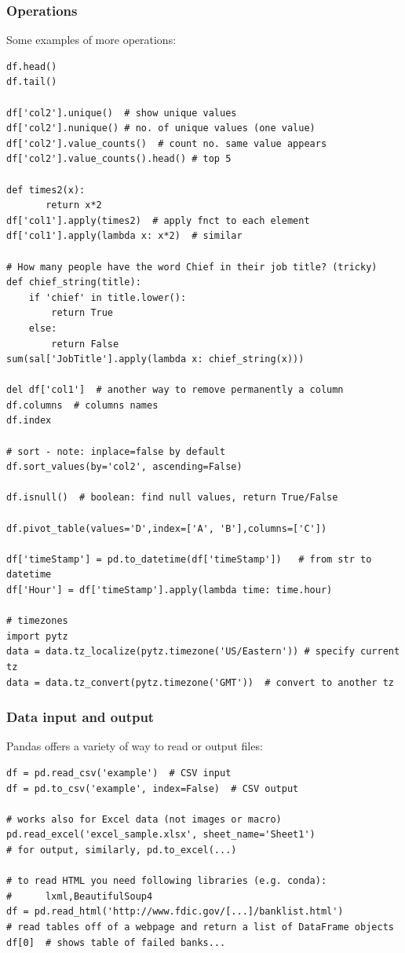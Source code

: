 \documentclass[11pt]{article}
\begin{document}
\subsubsection{Operations}
Some examples of more operations:
\begin{lstlisting}
df.head()
df.tail()

df['col2'].unique()  # show unique values
df['col2'].nunique() # no. of unique values (one value)
df['col2'].value_counts()  # count no. same value appears
df['col2'].value_counts().head() # top 5

def times2(x): 
       return x*2
df['col1'].apply(times2)  # apply fnct to each element
df['col1'].apply(lambda x: x*2)  # similar

# How many people have the word Chief in their job title? (tricky)
def chief_string(title):
	if 'chief' in title.lower():
		return True
	else:
		return False
sum(sal['JobTitle'].apply(lambda x: chief_string(x)))

del df['col1']  # another way to remove permanently a column
df.columns  # columns names
df.index 

# sort - note: inplace=false by default
df.sort_values(by='col2', ascending=False)  

df.isnull()  # boolean: find null values, return True/False

df.pivot_table(values='D',index=['A', 'B'],columns=['C'])

df['timeStamp'] = pd.to_datetime(df['timeStamp'])   # from str to datetime
df['Hour'] = df['timeStamp'].apply(lambda time: time.hour)

# timezones
import pytz
data = data.tz_localize(pytz.timezone('US/Eastern')) # specify current tz
data = data.tz_convert(pytz.timezone('GMT'))  # convert to another tz
\end{lstlisting}

\subsubsection{Data input and output} 
Pandas offers a variety of way to read or output files:
\begin{lstlisting}
df = pd.read_csv('example')  # CSV input
df = pd.to_csv('example', index=False)  # CSV output

# works also for Excel data (not images or macro)            
pd.read_excel('excel_sample.xlsx', sheet_name='Sheet1') 
# for output, similarly, pd.to_excel(...)

# to read HTML you need following libraries (e.g. conda): 
#      lxml,BeautifulSoup4
df = pd.read_html('http://www.fdic.gov/[...]/banklist.html')  
# read tables off of a webpage and return a list of DataFrame objects
df[0]  # shows table of failed banks...
\end{lstlisting}
\end{document}
